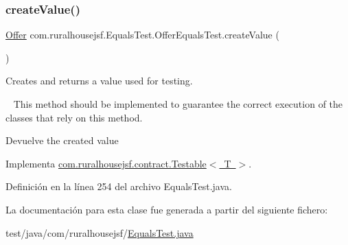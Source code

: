 \mbox{\label{classcom_1_1ruralhousejsf_1_1_equals_test_1_1_offer_equals_test_a25524d0ab8278899774751c0f7630e8d}} 
\subsubsection{\texorpdfstring{createValue()}{createValue()}}
{\footnotesize\ttfamily \mbox{\hyperlink{classcom_1_1ruralhousejsf_1_1domain_1_1_offer}{Offer}} com.\+ruralhousejsf.\+Equals\+Test.\+Offer\+Equals\+Test.\+create\+Value (\begin{DoxyParamCaption}{ }\end{DoxyParamCaption})}



Creates and returns a value used for testing. 

~\newline
 This method should be implemented to guarantee the correct execution of the classes that rely on this method.

\begin{DoxyReturn}{Devuelve}
the created value 
\end{DoxyReturn}


Implementa \mbox{\hyperlink{interfacecom_1_1ruralhousejsf_1_1contract_1_1_testable_ae4546a381488faaba1ef7c0f8688de9c}{com.\+ruralhousejsf.\+contract.\+Testable$<$ T $>$}}.



Definición en la línea 254 del archivo Equals\+Test.\+java.



La documentación para esta clase fue generada a partir del siguiente fichero\+:\begin{DoxyCompactItemize}
\item 
test/java/com/ruralhousejsf/\mbox{\hyperlink{_equals_test_8java}{Equals\+Test.\+java}}\end{DoxyCompactItemize}
